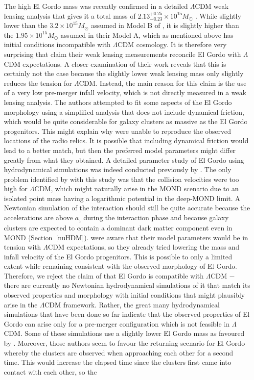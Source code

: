\documentclass[fleqn,usenatbib,useAMS]{mnras} %
\begin{document}
The high El Gordo mass was recently confirmed in a detailed $\Lambda$CDM weak lensing analysis that gives it a total mass of $2.13^{+0.25}_{-0.23} \times 10^{15} M_\odot$ \citep{Kim_2021_El_Gordo}. While slightly lower than the $3.2 \times 10^{15} M_\odot$ assumed in Model B of \citet{Zhang_2015}, it is slightly higher than the $1.95 \times 10^{15} M_\odot$ assumed in their Model A, which as mentioned above has initial conditions incompatible with $\Lambda$CDM cosmology. It is therefore very surprising that \citet{Kim_2021_El_Gordo} claim their weak lensing measurements reconcile El Gordo with $\Lambda$CDM expectations. A closer examination of their work reveals that this is certainly not the case because the slightly lower weak lensing mass only slightly reduces the tension for $\Lambda$CDM. Instead, the main reason for this claim is the use of a very low pre-merger infall velocity, which is not directly measured in a weak lensing analysis. The authors attempted to fit some aspects of the El Gordo morphology using a simplified analysis that does not include dynamical friction, which would be quite considerable for galaxy clusters as massive as the El Gordo progenitors. This might explain why \citet{Kim_2021_El_Gordo} were unable to reproduce the observed locations of the radio relics. It is possible that including dynamical friction would lead to a better match, but then the preferred model parameters might differ greatly from what they obtained. A detailed parameter study of El Gordo using hydrodynamical simulations was indeed conducted previously by \citet{Zhang_2015}. The only problem identified by \citet{Kim_2021_El_Gordo} with this study was that the collision velocities were too high for $\Lambda$CDM, which might naturally arise in the MOND scenario due to an isolated point mass having a logarithmic potential in the deep-MOND limit. A Newtonian simulation of the interaction should still be quite accurate because the accelerations are above $a_{_0}$ during the interaction phase and because galaxy clusters are expected to contain a dominant dark matter component even in MOND (Section~\ref{nuHDM}). \citet{Zhang_2015} were aware that their model parameters would be in tension with $\Lambda$CDM expectations, so they already tried lowering the mass and infall velocity of the El Gordo progenitors. This is possible to only a limited extent while remaining consistent with the observed morphology of El Gordo. Therefore, we reject the claim of \citet{Kim_2021_El_Gordo} that El Gordo is compatible with $\Lambda$CDM $-$ there are currently no Newtonian hydrodynamical simulations of it that match its observed properties and morphology with initial conditions that might plausibly arise in the $\Lambda$CDM framework. Rather, the great many hydrodynamical simulations that have been done so far indicate that the observed properties of El Gordo can arise only for a pre-merger configuration which is not feasible in $\Lambda$CDM. Some of these simulations use a slightly lower El Gordo mass as favoured by \citet{Kim_2021_El_Gordo}. Moreover, those authors seem to favour the returning scenario for El Gordo whereby the clusters are observed when approaching each other for a second time. This would increase the elapsed time since the clusters first came into contact with each other, so the 
\end{document}
